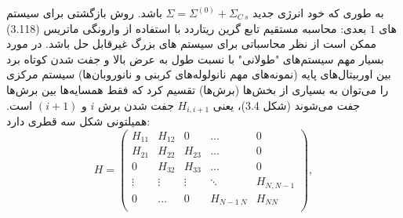 به طوری که خود انرژی جدید $\Sigma ={{\Sigma }^{(0)}}+{{\Sigma }_{C\ s}}$ باشد. 
روش بازگشتی برای سیستم های $1$ بعدی:
محاسبه مستقیم تابع گرین ریتاردد با استفاده از وارونگی ماتریس (3.118) ممکن است از نظر محاسباتی برای سیستم های بزرگ غیرقابل حل باشد. در مورد بسیار مهم سیستم‌های "طولانی" با نسبت طول به عرض بالا و جفت شدن کوتاه برد بین اوربیتال‌های پایه (نمونه‌های مهم نانولوله‌های کربنی و نانوروبان‌ها) سیستم مرکزی را می‌توان به بسیاری از بخش‌ها (برش‌ها) تقسیم کرد که فقط همسایه‌ها بین برش‌ها جفت می‌شوند (شکل 3.4)، یعنی $H_{i,i+1}$ جفت شدن برش $i$ و $(i + 1)$ است. همیلتونی شکل سه قطری دارد:
\begin{equation}
    H=\left( \begin{matrix}
           {{H}_{11}} & {{H}_{12}} & 0 & \ldots  & 0  \\
           {{H}_{21}} & {{H}_{22}} & {{H}_{23}} & \ldots  & 0  \\
           0 & {{H}_{32}} & {{H}_{33}} & \ldots  & 0  \\
           \vdots  & \vdots  & \vdots  & \ddots  & {{H}_{N,N-1}}  \\
           0 & \ldots  & 0 & {{H}_{N-1\ N}} & {{H}_{NN}}  \\
        \end{matrix} \right),
\end{equation}

